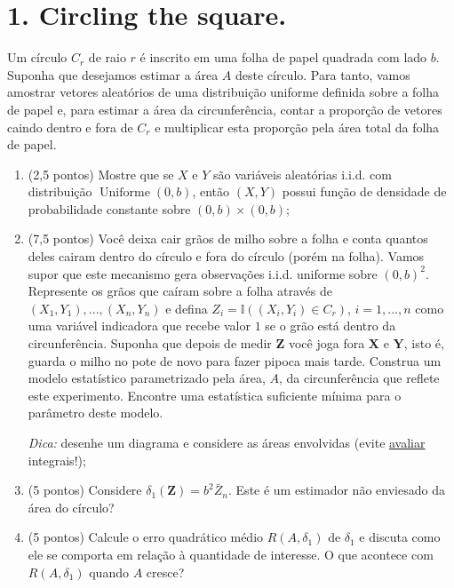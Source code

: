 \documentclass[a4paper,10pt, notitlepage]{report}
\begin{document}
\newpage

\section*{1. Circling the square.}

Um círculo $C_r$  de raio $r$ é inscrito em uma folha de papel quadrada com lado $b$.
Suponha que desejamos estimar a área $A$ deste círculo.
Para tanto, vamos amostrar vetores aleatórios de uma distribuição uniforme definida sobre a folha de papel e, para estimar a área da circunferência, contar a proporção de vetores caindo dentro e fora de $C_r$ e multiplicar esta proporção pela área total da folha de papel.

\begin{enumerate}[label=\alph*)]
 \item (2,5 pontos) Mostre que se $X$ e $Y$ são variáveis aleatórias i.i.d. com distribuição $\operatorname{Uniforme}(0,b)$, então $(X,Y)$ possui função de densidade de probabilidade constante sobre $(0, b)\times (0,b)$;
 
 \item (7,5 pontos) Você deixa cair grãos de milho sobre a folha e conta quantos deles cairam dentro do círculo e fora do círculo (porém na folha).
    Vamos supor que este mecanismo gera observações i.i.d. uniforme sobre $(0,b)^2$.
    Represente os grãos que caíram sobre a folha através de $(X_1,Y_1),...,(X_n,Y_n)$ e  defina $Z_i = \mathbb{I}((X_i,Y_i)\in C_r)$, $i=1,...,n$ como uma variável indicadora que recebe valor $1$ se o grão está dentro da circunferência.
    Suponha que depois de medir $\boldsymbol{Z}$ você joga fora $\boldsymbol{X}$ e $\boldsymbol{Y}$, isto é, guarda o milho no pote de novo para fazer pipoca mais tarde.
    Construa um modelo estatístico parametrizado pela área, $A$, da circunferência que reflete este experimento.
    Encontre uma estatística suficiente mínima para o parâmetro deste modelo.
    
    \textit{Dica:} desenhe um diagrama e considere as áreas envolvidas (evite \underline{avaliar} integrais!);
    
 \item (5 pontos) Considere $\delta_1(\boldsymbol{Z}) = b^2\bar{Z}_n$.
 Este é um estimador não enviesado da área do círculo?
 \item (5 pontos) Calcule o erro quadrático médio $R(A, \delta_1)$ de $\delta_1$ e discuta como ele se comporta em relação à quantidade de interesse.
 O que acontece com $R(A, \delta_1)$ quando $A$ cresce?
\end{enumerate}
\end{document}
